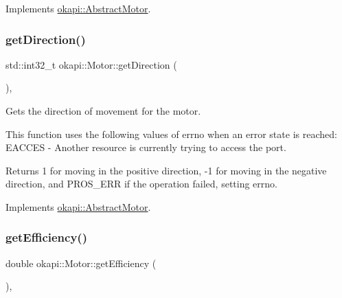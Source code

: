 Implements \mbox{\hyperlink{classokapi_1_1AbstractMotor_ab83ef3319ffe1cb1d020e5a10127aab8}{okapi\+::\+Abstract\+Motor}}.

\mbox{\label{classokapi_1_1Motor_a72c69d60e2ec69c126c84dc81f78742d}} 
\subsubsection{\texorpdfstring{getDirection()}{getDirection()}}
{\footnotesize\ttfamily std\+::int32\+\_\+t okapi\+::\+Motor\+::get\+Direction (\begin{DoxyParamCaption}{ }\end{DoxyParamCaption})\hspace{0.3cm}{\ttfamily [override]}, {\ttfamily [virtual]}}

Gets the direction of movement for the motor.

This function uses the following values of errno when an error state is reached\+: E\+A\+C\+C\+ES -\/ Another resource is currently trying to access the port.

\begin{DoxyReturn}{Returns}
1 for moving in the positive direction, -\/1 for moving in the negative direction, and P\+R\+O\+S\+\_\+\+E\+RR if the operation failed, setting errno. 
\end{DoxyReturn}


Implements \mbox{\hyperlink{classokapi_1_1AbstractMotor_a94763d1700bd91b995333b012c0b683f}{okapi\+::\+Abstract\+Motor}}.

\mbox{\label{classokapi_1_1Motor_a7703340c95e9e7dcafa243685a7d2d50}} 
\subsubsection{\texorpdfstring{getEfficiency()}{getEfficiency()}}
{\footnotesize\ttfamily double okapi\+::\+Motor\+::get\+Efficiency (\begin{DoxyParamCaption}{ }\end{DoxyParamCaption})\hspace{0.3cm}{\ttfamily [override]}, {\ttfamily [virtual]}}

